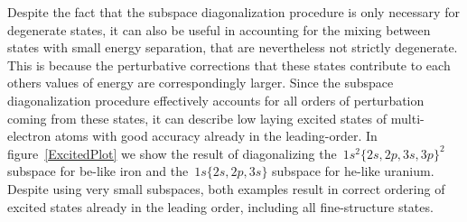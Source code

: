 Despite the fact that the subspace diagonalization procedure is only necessary for degenerate states, it can also be useful in accounting for the mixing between states with small energy separation, that are nevertheless not strictly degenerate. This is because the perturbative corrections that these states contribute to each others values of energy are correspondingly larger. Since the subspace diagonalization procedure effectively accounts for all orders of perturbation coming from these states, it can describe low laying excited states of multi-electron atoms with good accuracy already in the leading-order. In figure~\ref{ExcitedPlot} we show the result of diagonalizing the~$1s^2 \{2s,2p,3s,3p\}^2$ subspace for be-like iron and the~$1s\{2s,2p,3s\}$ subspace for he-like uranium. Despite using  very small subspaces, both examples result in correct ordering of excited states already in the leading order, including all fine-structure states. 


